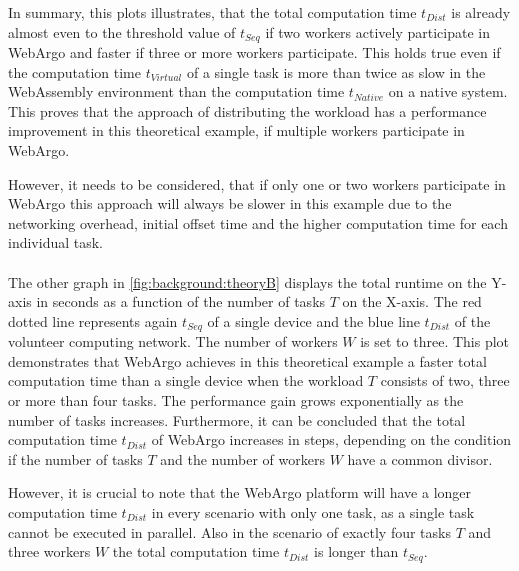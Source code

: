 In summary, this plots illustrates, that the total computation time $t_{Dist}$ is already almost even to the threshold value of $t_{Seq}$ if two workers actively participate in WebArgo and faster if three or more workers participate. This holds true even if the computation time $t_{Virtual}$ of a single task is more than twice as slow in the WebAssembly environment than the computation time $t_{Native}$ on a native system. This proves that the approach of distributing the workload has a performance improvement in this theoretical example, if multiple workers participate in WebArgo. 

However, it needs to be considered, that if only one or two workers participate in WebArgo this approach will always be slower in this example due to the networking overhead, initial offset time and the higher computation time for each individual task.
\\~\\
The other graph in \autoref{fig:background:theoryB} displays the total runtime on the Y-axis in seconds as a function of the number of tasks $T$ on the X-axis. The red dotted line represents again $t_{Seq}$ of a single device and the blue line $t_{Dist}$ of the volunteer computing network. The number of workers $W$ is set to three. This plot demonstrates that WebArgo achieves in this theoretical example a faster total computation time than a single device when the workload $T$ consists of two, three or more than four tasks. The performance gain grows exponentially as the number of tasks increases. Furthermore, it can be concluded that the total computation time $t_{Dist}$ of WebArgo increases in steps, depending on the condition if the number of tasks $T$ and the number of workers $W$ have a common divisor. 

However, it is crucial to note that the WebArgo platform will have a longer computation time $t_{Dist}$ in every scenario with only one task, as a single task cannot be executed in parallel. Also in the scenario of exactly four tasks $T$ and three workers $W$ the total computation time $t_{Dist}$ is longer than $t_{Seq}$.